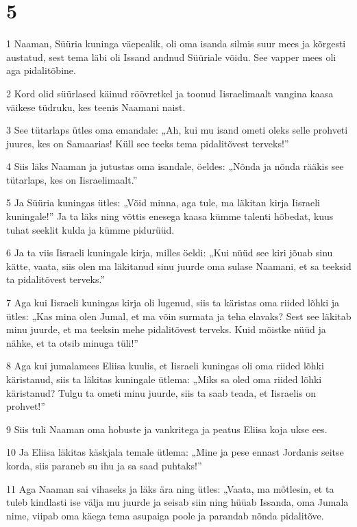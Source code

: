 \chapter{5}

\par 1 Naaman, Süüria kuninga väepealik, oli oma isanda silmis suur mees ja kõrgesti austatud, sest tema läbi oli Issand andnud Süüriale võidu. See vapper mees oli aga pidalitõbine.
\par 2 Kord olid süürlased käinud röövretkel ja toonud Iisraelimaalt vangina kaasa väikese tüdruku, kes teenis Naamani naist.
\par 3 See tütarlaps ütles oma emandale: „Ah, kui mu isand ometi oleks selle prohveti juures, kes on Samaarias! Küll see teeks tema pidalitõvest terveks!”
\par 4 Siis läks Naaman ja jutustas oma isandale, öeldes: „Nõnda ja nõnda rääkis see tütarlaps, kes on Iisraelimaalt.”
\par 5 Ja Süüria kuningas ütles: „Võid minna, aga tule, ma läkitan kirja Iisraeli kuningale!” Ja ta läks ning võttis enesega kaasa kümme talenti hõbedat, kuus tuhat seeklit kulda ja kümme pidurüüd.
\par 6 Ja ta viis Iisraeli kuningale kirja, milles öeldi: „Kui nüüd see kiri jõuab sinu kätte, vaata, siis olen ma läkitanud sinu juurde oma sulase Naamani, et sa teeksid ta pidalitõvest terveks.”
\par 7 Aga kui Iisraeli kuningas kirja oli lugenud, siis ta käristas oma riided lõhki ja ütles: „Kas mina olen Jumal, et ma võin surmata ja teha elavaks? Sest see läkitab minu juurde, et ma teeksin mehe pidalitõvest terveks. Kuid mõistke nüüd ja nähke, et ta otsib minuga tüli!”
\par 8 Aga kui jumalamees Eliisa kuulis, et Iisraeli kuningas oli oma riided lõhki käristanud, siis ta läkitas kuningale ütlema: „Miks sa oled oma riided lõhki käristanud? Tulgu ta ometi minu juurde, siis ta saab teada, et Iisraelis on prohvet!”
\par 9 Siis tuli Naaman oma hobuste ja vankritega ja peatus Eliisa koja ukse ees.
\par 10 Ja Eliisa läkitas käskjala temale ütlema: „Mine ja pese ennast Jordanis seitse korda, siis paraneb su ihu ja sa saad puhtaks!”
\par 11 Aga Naaman sai vihaseks ja läks ära ning ütles: „Vaata, ma mõtlesin, et ta tuleb kindlasti ise välja mu juurde ja seisab siin ning hüüab Issanda, oma Jumala nime, viipab oma käega tema asupaiga poole ja parandab nõnda pidalitõve.
